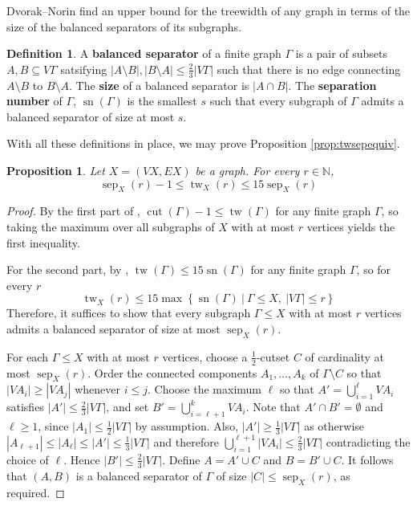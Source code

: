 \documentclass{article}
\numberwithin{equation}{section}
\newtheorem{proposition}[equation]{Proposition}
\theoremstyle{definition}
\newtheorem{definition}[equation]{Definition}
\theoremstyle{citing}
\DeclareMathOperator{\sn}{sn}
\DeclareMathOperator{\tw}{tw}
\DeclareMathOperator{\cut}{cut}
\DeclareMathOperator{\sep}{sep}
\newcommand{\setcon}[2]{\left\{#1\ \left|\ #2\right.\right\}}
\newcommand{\N}{\mathbb{N}}
\numberwithin{equation}{section}
\begin{document}
Dvorak--Norin find an upper bound for the treewidth of any graph in terms of the size of the balanced separators of its subgraphs.


\begin{definition}\label{defn:balancedsep}
    A \textbf{balanced separator} of a finite graph $\Gamma$ is a pair of subsets $A,B\subseteq V\Gamma$ satsifying $|A\setminus B|,|B\setminus A|\leq \frac23|V\Gamma|$ such that there is no edge connecting $A\setminus B$ to $B\setminus A$. The \textbf{size} of a balanced separator is $|A\cap B|$. The \textbf{separation number} of $\Gamma$, $\sn(\Gamma)$ is the smallest $s$ such that every subgraph of $\Gamma$ admits a balanced separator of size at most $s$.
\end{definition}

With all these definitions in place, we may prove Proposition \ref{prop:twsepequiv}.
    
\begin{proposition} Let $X=(VX,EX)$ be a graph. For every $r\in\N$,
\[
    \sep_X(r)-1\leq \tw_X(r) \leq 15\sep_X(r)
\]
\end{proposition}
\begin{proof}
    By the first part of \cite[Lemma 2.3]{BenSchTim-12-separation-graphs}, $\cut(\Gamma)-1\leq \tw(\Gamma)$ for any finite graph $\Gamma$, so taking the maximum over all subgraphs of $X$ with at most $r$ vertices yields the first inequality.
    
    For the second part, by \cite[Theorem 1]{Dvorak-Norin}, $\tw(\Gamma)\leq 15\sn(\Gamma)$ for any finite graph $\Gamma$, so for every $r$
    \[
        \tw_X(r)\leq 15\max\setcon{\sn(\Gamma)}{\Gamma\leq X,\ |V\Gamma|\leq r}
    \]
    Therefore, it suffices to show that every subgraph $\Gamma\leq X$ with at most $r$ vertices admits a balanced separator of size at most $\sep_X(r)$.
    
    For each $\Gamma\leq X$ with at most $r$ vertices, choose a $\frac12$-cutset $C$ of cardinality at most $\sep_X(r)$. Order the connected components $A_1,\ldots,A_k$ of $\Gamma\setminus C$ so that $|VA_i|\geq|VA_j|$ whenever $i\leq j$. Choose the maximum $\ell$ so that $A'=\bigcup_{i=1}^{\ell} VA_i$ satisfies $|A'| \leq \frac23|V\Gamma|$, and set $B'=\bigcup_{i=\ell+1}^k VA_i$. Note that $A'\cap B'=\emptyset$ and $\ell\geq 1$, since $|A_1|\leq\frac12|V\Gamma|$ by assumption. Also, $|A'|\geq\frac{1}{3}|V\Gamma|$ as otherwise $|A_{\ell+1}|\leq |A_\ell|\leq |A'|\leq \frac{1}{3}|V\Gamma|$ and therefore $\bigcup_{i=1}^{\ell+1} |VA_i|\leq\frac23|V\Gamma|$ contradicting the choice of $\ell$. Hence $|B'|\leq\frac23|V\Gamma|$. Define $A=A'\cup C$ and $B=B'\cup C$. It follows that $(A,B)$ is a balanced separator of $\Gamma$ of size $|C|\leq \sep_X(r)$, as required.
\end{proof}
\end{document}

